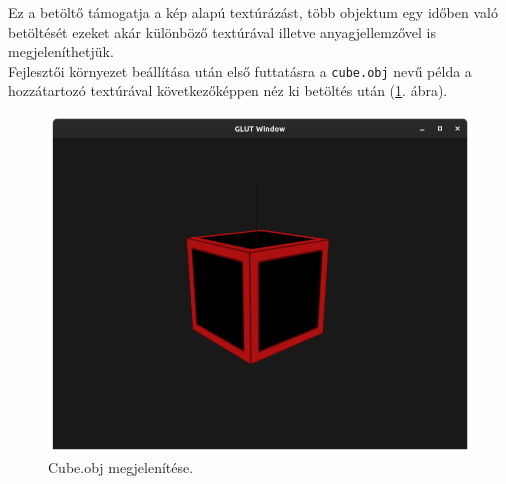 Ez a betöltő támogatja a kép alapú textúrázást, több objektum egy időben való betöltését  ezeket akár különböző textúrával illetve anyagjellemzővel is megjeleníthetjük.\\

Fejlesztői környezet beállítása után első futtatásra a \texttt{cube.obj} nevű példa a hozzátartozó textúrával következőképpen néz ki betöltés után (\ref{fig:model1}. ábra).
\begin{figure}[h]
\centering
\includegraphics[width=\textwidth]{images/Model_loader.png}
\caption{Cube.obj megjelenítése.}
\label{fig:model1}
\end{figure}

